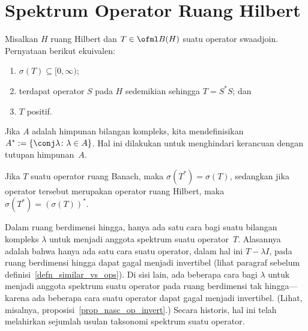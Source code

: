 














\section{Spektrum Operator Ruang Hilbert}
\begin{prop} Misalkan $H$ ruang Hilbert dan $T \in \ofml B(H)$ suatu operator swaadjoin. Pernyataan berikut
ekuivalen:
 \begin{enumerate}
    \item[(i)] $\sigma(T) \subseteq [0,\infty)$;
    \item[(ii)] terdapat operator $S$ pada $H$ sedemikian sehingga $T = S^*S$; dan
    \item[(iii)] $T$ positif.
 \end{enumerate}
\end{prop}

\begin{notn} Jika $A$ adalah himpunan bilangan kompleks, kita
mendefinisikan $A^* := \{\conj\lambda \colon \lambda \in A\}$. Hal ini dilakukan untuk menghindari kerancuan dengan tutupan himpunan~$A$.
\end{notn}

\begin{prop} Jika $T$ suatu operator ruang Banach, maka $\sigma(T^*) = \sigma(T)$, sedangkan jika operator tersebut merupakan operator ruang Hilbert,
maka $\sigma(T^*) = (\sigma(T))^*$.
\end{prop}

Dalam ruang berdimensi hingga, hanya ada satu cara bagi suatu bilangan kompleks $\lambda$ untuk menjadi anggota spektrum suatu operator~$T$.
Alasannya adalah bahwa hanya ada satu cara suatu operator, dalam hal ini $T - \lambda I$, pada ruang berdimensi hingga dapat gagal
menjadi invertibel (lihat paragraf sebelum definisi~\ref{defn_similar_vs_ops}). Di sisi lain, ada beberapa cara bagi $\lambda$
untuk menjadi anggota spektrum suatu operator pada ruang berdimensi tak hingga---karena ada beberapa cara suatu operator dapat gagal
menjadi invertibel. (Lihat, misalnya, proposisi~\ref{prop_nasc_op_invert}.) Secara historis, hal ini telah melahirkan sejumlah usulan
taksonomi spektrum suatu operator.

